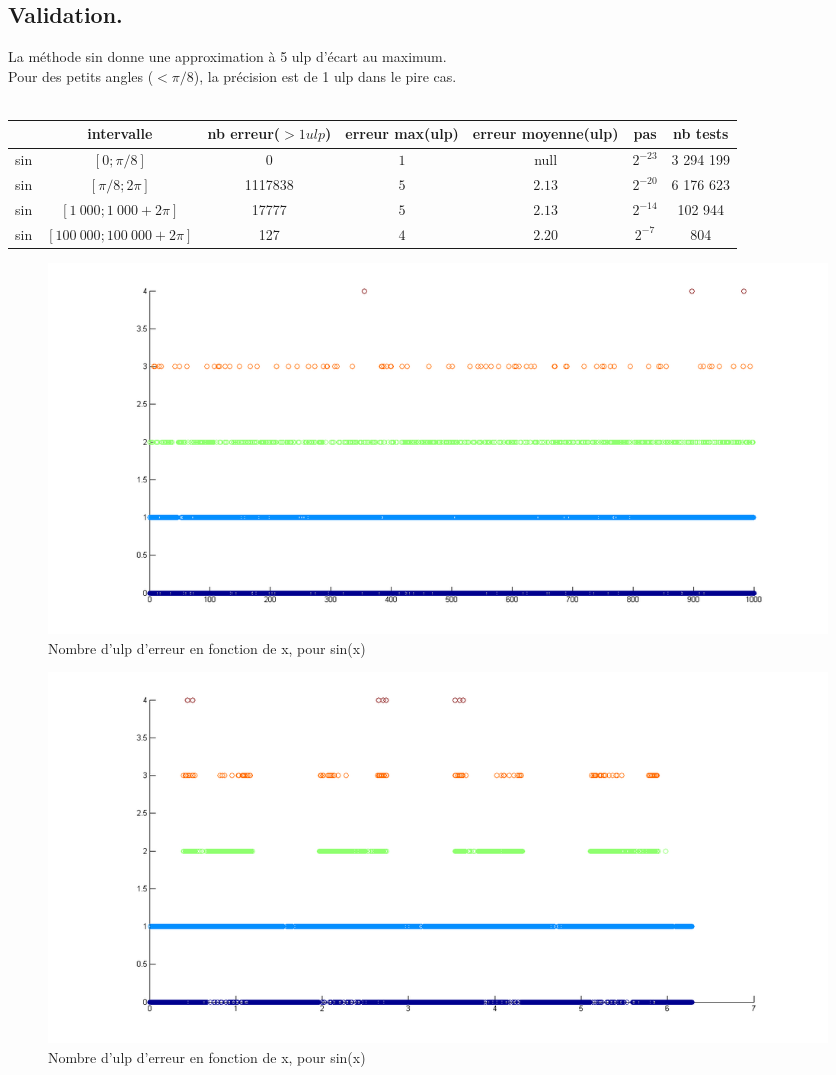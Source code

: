 \documentclass[a4,12pt]{article}
\begin{document}
\subsection{Validation.}
La méthode sin donne une approximation à 5 ulp d'écart au maximum.\\
Pour des petits angles ($<\pi /8$), la précision est de 1 ulp dans le pire cas.\\
\\

\hspace{-4cm}\begin{tabular}{|c|c|c|c|c|c|c|}

\hline 
 & intervalle & nb erreur($>1 ulp$) & erreur max(ulp)& erreur moyenne(ulp) & pas & nb tests \\
\hline 
sin & $[0; \pi /8]$             & 0       & $1$ & null        &$2^{-23}$ & 3 294 199\\
\hline 
sin & $[\pi /8; 2\pi]$          & 1117838 & $5$ &$2.13$ & $2^{-20}$ & 6 176 623\\
\hline 
sin & $[1\ 000; 1\ 000 + 2\pi]$     & 17777    & $5$ &$2.13$ & $2^{-14}$ & 102 944\\
\hline 
sin & $[100\ 000; 100\ 000 + 2\pi]$ & 127      & $4$ &$ 2.20$ & $2^{-7}$ & 804\\
\hline
\end{tabular}
\newline
\begin{figure}[h!]
    \hspace{-5cm}
    \centering
    \includegraphics[scale=0.5]{sin1000}
    \caption{Nombre d'ulp d'erreur en fonction de x, pour sin(x)}
    \label{fig:my_label}
\end{figure}
\newline
\begin{figure}[h!]
    \centering
    \hspace{-5cm}
    \includegraphics[scale=0.5]{sin2PI}
    \caption{Nombre d'ulp d'erreur en fonction de x, pour sin(x)}
    \label{fig:my_label}
\end{figure}
\end{document}
